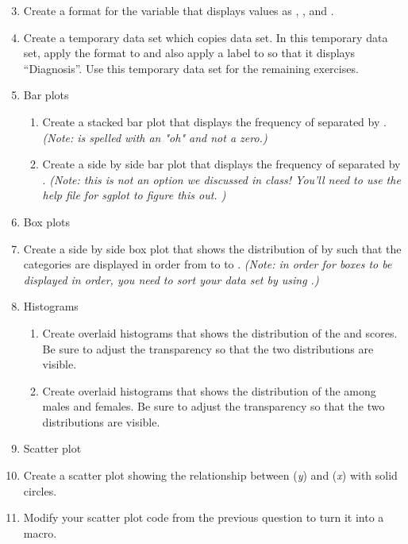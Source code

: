 \begin{enumerate}
\setcounter{enumi}{2}
\item Create a format for the  variable that displays values as , , and .
\item Create a temporary data set which copies  data set.  In this temporary data set, apply the format to  and also apply a label to  so that it displays ``Diagnosis''.  Use this temporary data set for the remaining exercises.
\item Bar plots
\begin{enumerate}
\item Create a stacked bar plot that displays the frequency of  separated by . \emph{(Note:  is spelled with an "oh" and not a zero.)}
\item Create a side by side bar plot that displays the frequency of  separated by . \emph{(Note: this is not an option we discussed in class!  You'll need to use the help file for sgplot to figure this out. )}
\end{enumerate}
\item Box plots
\item[] Create a side by side box plot that shows the distribution of  by  such that the  categories are displayed in order from  to  to .  	\emph{(Note: in order for boxes to be displayed in order, you need to sort your data set by  using .)}
\item Histograms
\begin{enumerate}
    \item Create overlaid histograms that shows the distribution of the  and  scores.  Be sure to adjust the transparency so that the two distributions are visible.
    \item Create overlaid histograms that shows the distribution of the  among males and females.  Be sure to adjust the transparency so that the two distributions are visible.
\end{enumerate}	
\item Scatter plot	
\item[] Create a scatter plot showing the relationship between  (\emph{y}) and  (\emph{x}) with solid circles.
\item Modify your scatter plot code from the previous question to turn it into a macro.
\begin{enumerate}

\end{enumerate}
\end{enumerate}
